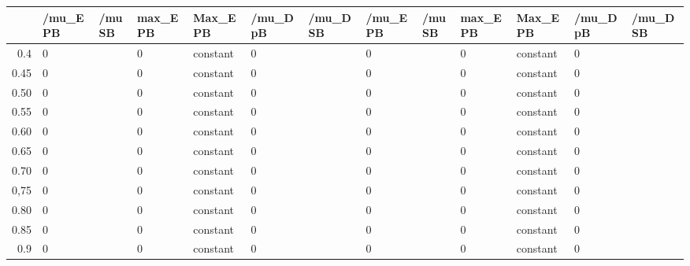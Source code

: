 \begin{table}[ht]
\centering
\begin{tabular}{rllllllllllll}
  \hline
 & /mu\_E PB & /mu SB & max\_E PB & Max\_E PB & /mu\_D pB & /mu\_D SB & /mu\_E PB & /mu SB & max\_E PB & Max\_E PB & /mu\_D pB & /mu\_D SB \\ 
  \hline
0.4 & 0 &  & 0 & constant & 0 &  & 0 &  & 0 & constant & 0 &  \\ 
  0.45 & 0 &  & 0 & constant & 0 &  & 0 &  & 0 & constant & 0 &  \\ 
  0.50 & 0 &  & 0 & constant & 0 &  & 0 &  & 0 & constant & 0 &  \\ 
  0.55 & 0 &  & 0 & constant & 0 &  & 0 &  & 0 & constant & 0 &  \\ 
  0.60 & 0 &  & 0 & constant & 0 &  & 0 &  & 0 & constant & 0 &  \\ 
  0.65 & 0 &  & 0 & constant & 0 &  & 0 &  & 0 & constant & 0 &  \\ 
  0.70 & 0 &  & 0 & constant & 0 &  & 0 &  & 0 & constant & 0 &  \\ 
  0,75 & 0 &  & 0 & constant & 0 &  & 0 &  & 0 & constant & 0 &  \\ 
  0.80 & 0 &  & 0 & constant & 0 &  & 0 &  & 0 & constant & 0 &  \\ 
  0.85 & 0 &  & 0 & constant & 0 &  & 0 &  & 0 & constant & 0 &  \\ 
  0.9 & 0 &  & 0 & constant & 0 &  & 0 &  & 0 & constant & 0 &  \\ 
   \hline
\end{tabular}
\end{table}
